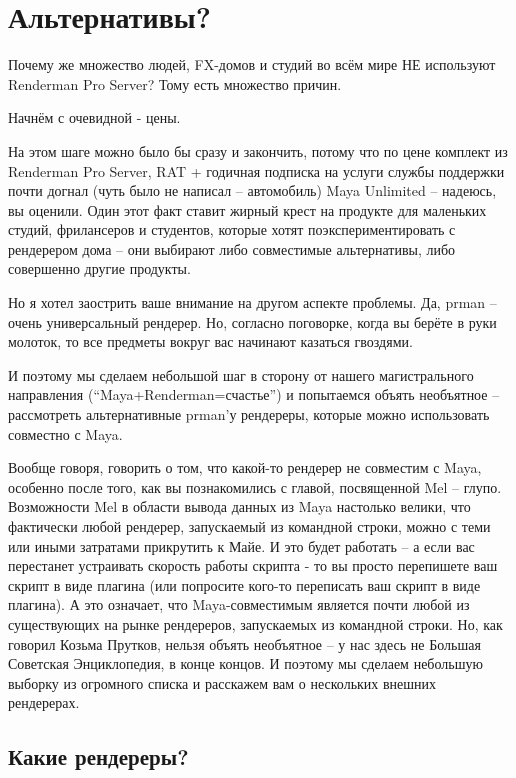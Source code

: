 \chapter*{Альтернативы?}
 

Почему же множество людей, FX-домов и студий во
   всём мире НЕ используют
   Renderman Pro Server? Тому есть множество причин.
 

Начнём с очевидной - цены.
 

На этом шаге можно было бы сразу и закончить,
   потому что по цене комплект из Renderman Pro Server, RAT + годичная
   подписка на услуги службы поддержки почти догнал (чуть было не
   написал – автомобиль) Maya Unlimited – надеюсь, вы оценили. Один
   этот факт ставит жирный крест на продукте для маленьких студий,
   фрилансеров и студентов, которые хотят поэкспериментировать с
   рендерером дома – они выбирают либо совместимые альтернативы, либо
   совершенно другие продукты.
 

Но я хотел заострить ваше внимание на другом
   аспекте проблемы. Да, prman – очень универсальный рендерер. Но,
   согласно поговорке, когда вы берёте в руки молоток, то все предметы
   вокруг вас начинают казаться гвоздями.
 

И поэтому мы сделаем небольшой шаг в сторону от
   нашего магистрального направления (“Maya+Renderman=счастье”) и
   попытаемся объять необъятное – рассмотреть альтернативные prman’у
   рендереры, которые можно использовать совместно с Maya.
 

Вообще говоря, говорить о том, что какой-то
   рендерер не совместим с Maya, особенно после того, как вы
   познакомились с главой, посвященной Mel – глупо. Возможности Mel в
   области вывода данных из Maya настолько велики, что фактически любой рендерер,
   запускаемый из командной строки, можно с теми или иными затратами
   прикрутить к Майе. И это будет работать – а если вас перестанет
   устраивать скорость работы скрипта - то вы просто перепишете ваш
   скрипт в виде плагина (или попросите кого-то переписать ваш скрипт
   в виде плагина). А это означает, что Maya-совместимым является
   почти любой из существующих на рынке рендереров, запускаемых из
   командной строки. Но, как говорил Козьма Прутков, нельзя объять
   необъятное – у нас здесь не Большая Советская Энциклопедия, в конце
   концов. И поэтому мы сделаем небольшую выборку из огромного списка
   и расскажем вам о нескольких внешних рендерерах.

 \section*{Какие рендереры?}
 

